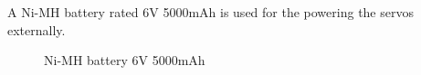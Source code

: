 \documentclass[12pt]{article}
\begin{document}
 A Ni-MH battery rated 6V 5000mAh is used for the powering the servos externally.
 \begin{figure}[h!]
 	\centering
 	\caption{Ni-MH battery 6V 5000mAh}
 \end{figure}
 
\end{document}
